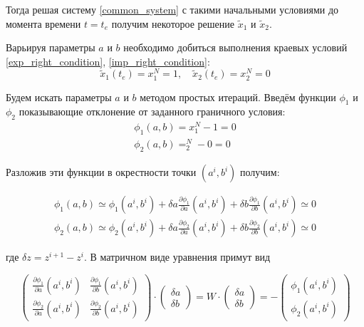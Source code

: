 \documentclass[a4paper,12pt]{article}
\begin{document}
Тогда решая систему \cref{common_system} с такими начальными условиями до момента времени \(t=t_e\) получим некоторое решение \(\tilde{x}_1\) и \(\tilde{x}_2\).

Варьируя параметры \(a\) и \(b\) необходимо добиться выполнения краевых условий \cref{exp_right_condition}, \cref{imp_right_condition}:
\begin{equation*}
  \tilde{x}_1(t_e)=x_1^N=1, \quad \tilde{x}_2(t_e)=x_2^N=0
\end{equation*}

Будем искать параметры \(a\) и \(b\) методом простых итераций. Введём
функции \(\phi_1\) и \(\phi_2\) показывающие отклонение от заданного
граничного условия:
\begin{gather*}
  \phi_1(a,b)=x_1^N-1=0\\
  \phi_2(a,b)=_2^N-0=0
\end{gather*}

Разложив эти функции в окрестности точки \((a^i, b^i)\) получим:

\begin{gather*}
  \phi_1(a,b)\simeq\phi_1(a^i,b^i)+\delta a\frac{\partial \phi_1}{\partial a}(a^i,b^i)+\delta b\frac{\partial \phi_1}{\partial b}(a^i,b^i)\simeq0\\
  \phi_2(a,b)\simeq\phi_2(a^i,b^i)+\delta a\frac{\partial \phi_2}{\partial a}(a^i,b^i)+\delta b\frac{\partial \phi_2}{\partial b}(a^i,b^i)\simeq0
\end{gather*}

где \(\delta z=z^{i+1}-z^{i}\). В матричном виде уравнения примут вид

\begin{equation*}
  \begin{pmatrix} 
    \frac{\partial \phi_1}{\partial a}(a^i,b^i)&\frac{\partial \phi_1}{\partial b}(a^i,b^i)\\
    \frac{\partial \phi_2}{\partial a}(a^i,b^i)&\frac{\partial \phi_2}{\partial b}(a^i,b^i)
  \end{pmatrix} \cdot \begin{pmatrix}
    \delta a\\
    \delta b
  \end{pmatrix} =W\cdot\begin{pmatrix}
    \delta a\\
    \delta b
  \end{pmatrix} = -\begin{pmatrix}
    \phi_1(a^i,b^i)\\
    \phi_2(a^i,b^i)
  \end{pmatrix}
\end{equation*}
\end{document}
